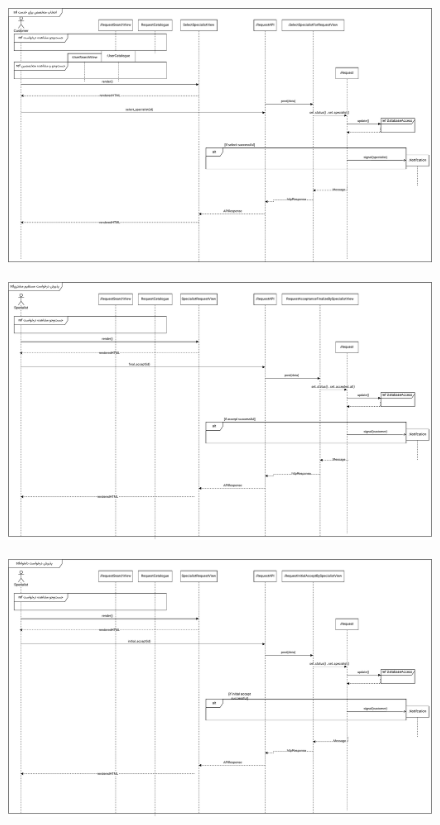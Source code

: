 \eject \pdfpagewidth=16in \pdfpageheight=10in
\begin{figure}[ht!]
	\centering
	\includegraphics[scale=0.8]{figs/design-sequence/3-12.pdf}
\end{figure}
\FloatBarrier
\newpage


\eject \pdfpagewidth=16in \pdfpageheight=10in
\begin{figure}[ht!]
	\centering
	\includegraphics[scale=0.8]{figs/design-sequence/3-13.pdf}
\end{figure}
\FloatBarrier
\newpage

\eject \pdfpagewidth=16in \pdfpageheight=10in
\begin{figure}[ht!]
	\centering
	\includegraphics[scale=0.8]{figs/design-sequence/3-14.pdf}
\end{figure}
\FloatBarrier
\newpage


